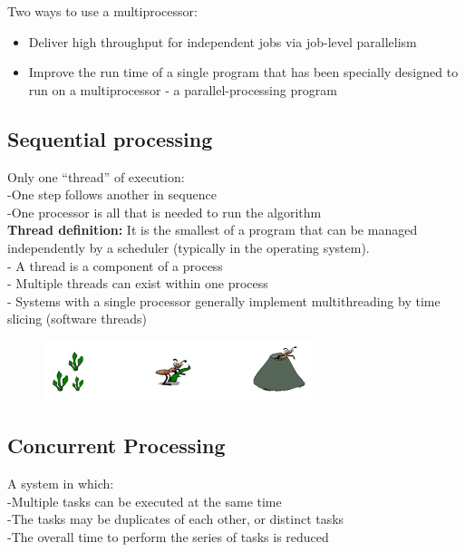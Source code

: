 \noindent
Two ways to use a multiprocessor:

\begin{itemize}
    \item Deliver high throughput for independent jobs via job-level parallelism
    \item Improve the run time of a single program that has been specially designed to run on a multiprocessor - a parallel-processing program
\end{itemize}


\subsection{Sequential processing}

Only one “thread” of execution:\\
-One step follows another in sequence\\
-One processor is all that is needed to run the algorithm\\

\textbf{Thread definition:} It is the smallest of a program that can be managed independently by a scheduler (typically in the operating system).\\

\noindent
- A thread is a component of a process\\
- Multiple threads can exist within one process\\
- Systems with a single processor generally implement multithreading by time slicing (software threads)


\begin{figure}[ht]
    \centering
    \includegraphics[width=0.7\textwidth]{figure_parallel/ant_sequential.png}\end{figure}
\FloatBarrier

\subsection{Concurrent Processing}

A system in which:\\
-Multiple tasks can be executed at the same time\\
-The tasks may be duplicates of each other, or distinct tasks\\
-The overall time to perform the series of tasks is reduced\\

